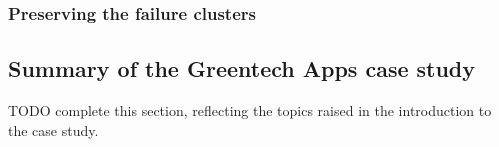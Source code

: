 \subsubsection{Preserving the failure clusters}




\subsection{Summary of the Greentech Apps case study}
TODO complete this section, reflecting the topics raised in the introduction to the case study.